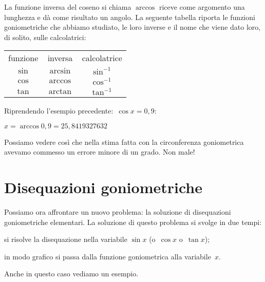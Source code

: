 La funzione inversa del coseno si chiama $\arccos$ riceve come argomento una
lunghezza e dà come risultato un angolo. La seguente tabella riporta le 
funzioni goniometriche che abbiamo studiato, le loro inverse e il nome che 
viene dato loro, di solito, sulle calcolatrici:

\begin{center}
\begin{tabular}{ccc}
funzione & inversa & calcolatrice\\
$\sin$ & $\arcsin$ & $\sin^{-1}$\\
$\cos$ & $\arccos$ & $\cos^{-1}$\\
$\tan$ & $\arctan$ & $\tan^{-1}$
\end{tabular}
\end{center}

\begin{esempio}
 Riprendendo l'esempio precedente:~$\cos x = 0,9$:
 
 $x = \arccos 0,9 = 25,8419327632$ 
 
 Possiamo vedere così che nella stima fatta con la circonferenza goniometrica 
 avevamo commesso un errore minore di un grado. Non male!
\end{esempio}


\section{Disequazioni goniometriche}
\label{sec:gonio_disequazionigonio}

Possiamo ora affrontare un nuovo problema: la soluzione di disequazioni 
goniometriche elementari. La soluzione di questo problema si svolge in due 
tempi:
\begin{enumerate*}
 \item si risolve la disequazione nella variabile $\sin x$ 
  (o~$\cos x$ o~$\tan x$);
 \item in modo grafico si passa dalla funzione goniometrica alla variabile~$x$.
\end{enumerate*}

Anche in questo caso vediamo un esempio.

